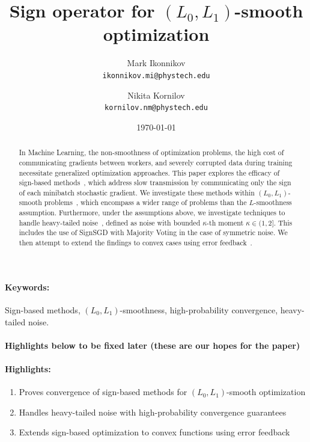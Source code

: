\documentclass[12pt]{article}
\title{Sign operator for $(L_0, L_1)$-smooth optimization}
\author{
  Mark Ikonnikov\\
  \texttt{ikonnikov.mi@phystech.edu}
  \and
  Nikita Kornilov\\
  \texttt{kornilov.nm@phystech.edu}
}
\date{\today}
\begin{document}
\maketitle

\begin{abstract}
In Machine Learning, the non-smoothness of optimization problems, the high cost of communicating gradients between workers, and severely corrupted data during training necessitate generalized optimization approaches. This paper explores the efficacy of sign-based methods~\cite{pmlr-v80-bernstein18a}, which address slow transmission by communicating only the sign of each minibatch stochastic gradient. We investigate these methods within $(L_0, L_1)$-smooth problems~\cite{gorbunov}, which encompass a wider range of problems than the $L$-smoothness assumption. Furthermore, under the assumptions above, we investigate techniques to handle heavy-tailed noise~\cite{Kornilov2025}, defined as noise with bounded $\kappa$-th moment $\kappa \in (1,2]$. This includes the use of SignSGD with Majority Voting in the case of symmetric noise. We then attempt to extend the findings to convex cases using error feedback~\cite{karimireddy}.
\end{abstract}

\paragraph{Keywords:} Sign-based methods, $(L_0, L_1)$-smoothness, high-probability convergence, heavy-tailed noise.

\paragraph{ Highlights below to be fixed later (these are our hopes for the paper)}

\paragraph{ Highlights:}
\begin{enumerate}
\item Proves convergence of sign-based methods for $(L_0, L_1)$-smooth optimization
\item Handles heavy-tailed noise with high-probability convergence guarantees
\item Extends sign-based optimization to convex functions using error feedback
\end{enumerate}
\end{document}
